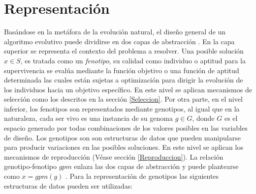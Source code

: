 \section{Representación}
Basándose en la metáfora de la evolución natural, el diseño general de un algoritmo evolutivo puede dividirse en dos capas de abstracción \cite{eiben2015evolutionary}. En la capa superior se representa el contexto del problema a resolver. Una posible solución $x \in S$, es tratada como un \textit{fenotipo}, su calidad como individuo o aptitud para la supervivencia se evalúa mediante la función objetivo o una función de aptitud determinada las cuales están sujetas a optimización para dirigir la evolución de los individuos hacia un objetivo específico. En este nivel se aplican mecanismos de selección como los descritos en la sección \ref{Seleccion}. Por otra parte, en el nivel inferior, los fenotipos son representados mediante genotipos, al igual que en la naturaleza, cada ser vivo es una instancia de su genoma $g \in G $, donde $G$ es el espacio generado por todas combinaciones de los valores posibles en las variables de diseño. Los genotipos son son estructuras de datos que pueden manipularse para producir variaciones en las posibles soluciones. En este nivel se aplican los mecanismos de reproducción (Véase sección \ref{Reproduccion}). La relación genotipo-fenotipo $gpm$ enlaza  las dos capas de abstracción y puede plantearse como $x = gpm (g)$ \cite{weise2009global}. Para la representación de genotipos las siguientes estructuras de datos pueden ser utilizadas:
